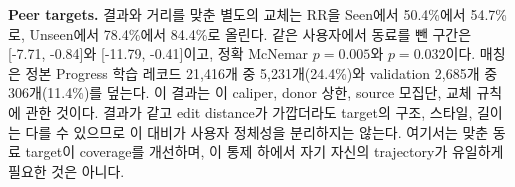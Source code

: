 \documentclass[10pt,conference]{IEEEtran}
\begin{document}
\noindent\textbf{Peer targets.} 결과와 거리를 맞춘 별도의 교체는 RR을 Seen에서 50.4\%에서 54.7\%로, Unseen에서 78.4\%에서 84.4\%로 올린다. 같은 사용자에서 동료를 뺀 구간은 [-7.71, -0.84]와 [-11.79, -0.41]이고, 정확 McNemar \(p=0.005\)와 \(p=0.032\)이다. 매칭은 정본 Progress 학습 레코드 21,416개 중 5,231개(24.4\%)와 validation 2,685개 중 306개(11.4\%)를 덮는다. 이 결과는 이 caliper, donor 상한, source 모집단, 교체 규칙에 관한 것이다. 결과가 같고 edit distance가 가깝더라도 target의 구조, 스타일, 길이는 다를 수 있으므로 이 대비가 사용자 정체성을 분리하지는 않는다. 여기서는 맞춘 동료 target이 coverage를 개선하며, 이 통제 하에서 자기 자신의 trajectory가 유일하게 필요한 것은 아니다.
\end{document}

